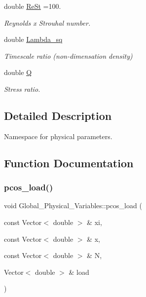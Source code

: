 \begin{DoxyCompactItemize}
double \hyperlink{namespaceGlobal__Physical__Variables_a085ee4bf968ffdd01a41b8c41864f907}{Re\+St} =100.
\begin{DoxyCompactList}\small\item\em Reynolds x Strouhal number. \end{DoxyCompactList}\item 
double \hyperlink{namespaceGlobal__Physical__Variables_a6fe17557ceb32dd353827fba60408363}{Lambda\+\_\+sq}
\begin{DoxyCompactList}\small\item\em Timescale ratio (non-\/dimensation density) \end{DoxyCompactList}\item 
double \hyperlink{namespaceGlobal__Physical__Variables_a66cb7ecda9ba0cd72367dd697f154545}{Q}
\begin{DoxyCompactList}\small\item\em Stress ratio. \end{DoxyCompactList}\end{DoxyCompactItemize}


\subsection{Detailed Description}
Namespace for physical parameters. 

\subsection{Function Documentation}
\mbox{\label{namespaceGlobal__Physical__Variables_aa08c246eac99f59be33ef4a6ee924990}} 
\subsubsection{\texorpdfstring{pcos\+\_\+load()}{pcos\_load()}}
{\footnotesize\ttfamily void Global\+\_\+\+Physical\+\_\+\+Variables\+::pcos\+\_\+load (\begin{DoxyParamCaption}\item[{const Vector$<$ double $>$ \&}]{xi,  }\item[{const Vector$<$ double $>$ \&}]{x,  }\item[{const Vector$<$ double $>$ \&}]{N,  }\item[{Vector$<$ double $>$ \&}]{load }\end{DoxyParamCaption})}


